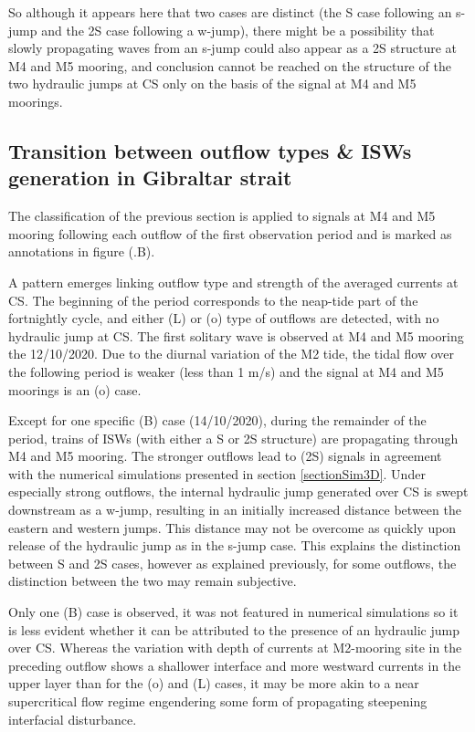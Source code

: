 So although it appears here that two cases are distinct (the S case following an s-jump and the 2S case following a w-jump), there might be a possibility that slowly propagating waves from an s-jump could also appear as a 2S structure at M4 and M5 mooring, and conclusion cannot be reached on the structure of the two hydraulic jumps at CS only on the basis of the signal at M4 and M5 moorings.


\subsection{Transition between outflow types \& ISWs generation in Gibraltar strait}

The classification of the previous section is applied to signals at M4 and M5 mooring following each outflow of the first observation period and is marked as annotations in figure (.B).

A pattern emerges linking outflow type and strength of the averaged currents at CS. The beginning of the period corresponds to the neap-tide part of the fortnightly cycle, and either (L) or (o) type of outflows are detected, with no hydraulic jump at CS. The first solitary wave is observed at M4 and M5 mooring the 12/10/2020. Due to the diurnal variation of the M2 tide, the tidal flow over the following period is weaker (less than 1 m/s) and the signal at M4 and M5 moorings is an (o) case.

Except for one specific (B) case (14/10/2020), during the remainder of the period, trains of ISWs (with either a S or 2S structure) are propagating through M4 and M5 mooring. The stronger outflows lead to (2S) signals in agreement with the numerical simulations presented in section \ref{sectionSim3D}. Under especially strong outflows, the internal hydraulic jump generated over CS is swept downstream as a w-jump, resulting in an initially increased distance between the eastern and western jumps. This distance may not be overcome as quickly upon release of the hydraulic jump as in the s-jump case. This explains the distinction between S and 2S cases, however as explained previously, for some outflows, the distinction between the two may remain subjective.

Only one (B) case is observed, it was not featured in numerical simulations so it is less evident whether it can be attributed to the presence of an hydraulic jump over CS. Whereas the variation with depth of currents at M2-mooring site in the preceding outflow shows a shallower interface and more westward currents in the upper layer than for the (o) and (L) cases, it may be more akin to a near supercritical flow regime engendering some form of propagating steepening interfacial disturbance.

